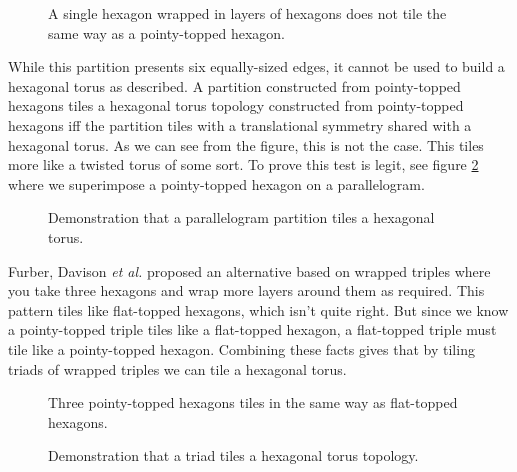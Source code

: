 	\begin{figure}
		\center
		
		\caption{A single hexagon wrapped in layers of hexagons does not tile the
		same way as a pointy-topped hexagon.}
		\label{fig:wrapped-hexagon-tiling}
	\end{figure}
	
	While this partition presents six equally-sized edges, it cannot be used
	to build a hexagonal torus as described. A partition constructed from
	pointy-topped hexagons tiles a hexagonal torus topology constructed from
	pointy-topped hexagons iff the partition tiles with a translational
	symmetry shared with a hexagonal torus. As we can see from the figure,
	this is not the case. This tiles more like a twisted torus of some sort.
	To prove this test is legit, see figure \ref{fig:parallelogram-tiling}
	where we superimpose a pointy-topped hexagon on a parallelogram.
	
	\begin{figure}
		\center
		
		\caption{Demonstration that a parallelogram partition tiles a hexagonal
		torus.}
		\label{fig:parallelogram-tiling}
	\end{figure}
	
	Furber, Davison \emph{et al.} \cite{davidsonWiring} proposed an
	alternative based on wrapped triples where you take three hexagons and
	wrap more layers around them as required. This pattern tiles like
	flat-topped hexagons, which isn't quite right. But since we know a
	pointy-topped triple tiles like a flat-topped hexagon, a flat-topped
	triple must tile like a pointy-topped hexagon. Combining these facts
	gives that by tiling triads of wrapped triples we can tile a hexagonal
	torus.
	
	\begin{figure}
		\center
		
		\caption{Three pointy-topped hexagons tiles in the same way as flat-topped
		hexagons.}
		\label{fig:wrapped-triple-tiling}
	\end{figure}
	
	\begin{figure}
		\center
		
		\caption{Demonstration that a triad tiles a hexagonal torus topology.}
		\label{fig:triad-tiling}
	\end{figure}
